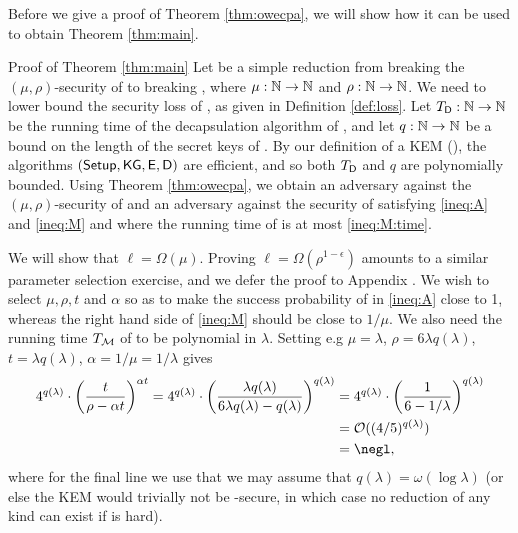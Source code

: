Before we give a proof of Theorem \ref{thm:owecpa},
we will show how it can be used to obtain Theorem \ref{thm:main}.

\begin{namedproof}{Proof of Theorem \ref{thm:main}}
  Let \redR be a simple reduction
  from breaking the \((\mu,\rho)\)-\OWECPA security of \KEM to breaking \Simple,
  where \(\mu : \mathbb{N} \to \mathbb{N}\) and \(\rho : \mathbb{N} \to \mathbb{N}\).
  We need to lower bound the security loss of \redR, as given in Definition \ref{def:loss}.
  Let \(T_{\mathsf{D}} : \mathbb{N} \to \mathbb{N}\) be the running time of the decapsulation algorithm \Decaps of \KEM,
  and let \(q : \mathbb{N} \to \mathbb{N}\) be a bound on the length of the secret keys of \KEM.
  By our definition of a KEM (),
  the algorithms \((\mathsf{Setup}, \mathsf{KG}, \mathsf{E}, \mathsf{D})\)
  are efficient, and so both \(T_{\mathsf{D}}\) and \(q\) are polynomially bounded.
  Using Theorem \ref{thm:owecpa},
  we obtain an adversary \advA against the \((\mu,\rho)\)-\OWECPA security of \KEM
  and an adversary \redM against the \SICA security of \Simple
  satisfying \eqref{ineq:A} and \eqref{ineq:M}
  and where the running time of \redM is at most \eqref{ineq:M:time}.


  We will show that \(\ell = \Omega(\mu)\).
  Proving \(\ell = \Omega(\rho^{1-\epsilon})\)
  amounts to a similar parameter selection exercise,
  and we defer the proof to Appendix .
  We wish to select \(\mu,\rho,t\) and \(\alpha\)
  so as to make the success probability of \advA in \eqref{ineq:A} close to 1,
  whereas the right hand side of \eqref{ineq:M} should be close to \(1/\mu\).
  We also need the running time \(T_{\mathcal{M}}\) of \redM to be polynomial in \(\lambda\).
  Setting e.g \(\mu = \lambda\), \(\rho = 6\lambda q(\lambda)\), \(t = \lambda q(\lambda)\),
  \(\alpha = 1/\mu = 1/\lambda\) gives
  \begin{align}
    4^{q(\lambda)} \cdot \left( \frac{t}{\rho - \alpha t} \right)^{\alpha t}
    =
    4^{q(\lambda)} \cdot \left( \frac{\lambda q(\lambda)}{6\lambda q(\lambda) - q(\lambda)} \right)^{q(\lambda)}
    & = 4^{q(\lambda)} \cdot \left( \frac{1}{6 - 1/\lambda} \right)^{q(\lambda)} \notag\\
    & = \mathcal{O}((4 / 5)^{q(\lambda)})\notag\\
    & = \negl, \notag
  \end{align}
  where for the final line we use that we may assume that
  \(q(\lambda) = \omega(\log{\lambda})\)
  (or else the KEM \KEM would trivially not be \OWECPA-secure,
  in which case no reduction of any kind can exist if \Simple is hard).


\end{namedproof}

